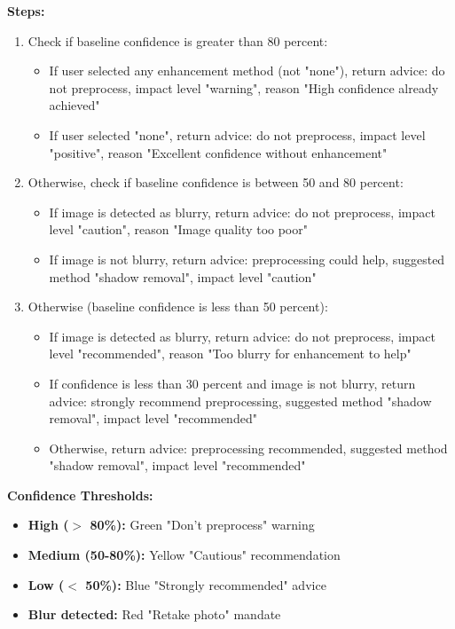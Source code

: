 \documentclass[12pt,a4paper]{article}
\begin{document}
\textbf{Steps:}
\begin{enumerate}
    \item Check if baseline confidence is greater than 80 percent:
    \begin{itemize}
        \item If user selected any enhancement method (not "none"), return advice: do not preprocess, impact level "warning", reason "High confidence already achieved"
        \item If user selected "none", return advice: do not preprocess, impact level "positive", reason "Excellent confidence without enhancement"
    \end{itemize}
    \item Otherwise, check if baseline confidence is between 50 and 80 percent:
    \begin{itemize}
        \item If image is detected as blurry, return advice: do not preprocess, impact level "caution", reason "Image quality too poor"
        \item If image is not blurry, return advice: preprocessing could help, suggested method "shadow removal", impact level "caution"
    \end{itemize}
    \item Otherwise (baseline confidence is less than 50 percent):
    \begin{itemize}
        \item If image is detected as blurry, return advice: do not preprocess, impact level "recommended", reason "Too blurry for enhancement to help"
        \item If confidence is less than 30 percent and image is not blurry, return advice: strongly recommend preprocessing, suggested method "shadow removal", impact level "recommended"
        \item Otherwise, return advice: preprocessing recommended, suggested method "shadow removal", impact level "recommended"
    \end{itemize}
\end{enumerate}

\textbf{Confidence Thresholds:}
\begin{itemize}
    \item \textbf{High ($>$ 80\%):} Green "Don't preprocess" warning
    \item \textbf{Medium (50-80\%):} Yellow "Cautious" recommendation
    \item \textbf{Low ($<$ 50\%):} Blue "Strongly recommended" advice
    \item \textbf{Blur detected:} Red "Retake photo" mandate
\end{itemize}
\end{document}
